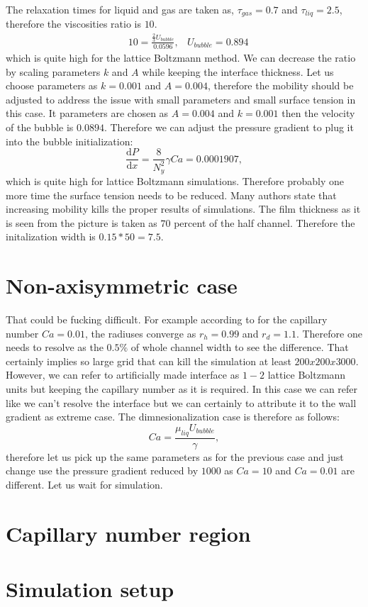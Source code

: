 \documentclass{article}
\begin{document}
The relaxation times for liquid and gas are taken as, $\tau_{gas}=0.7$ and $\tau_{liq}=2.5$,
therefore the viscosities ratio is $10$.
\begin{equation}
\begin{aligned}
&10=\frac{\frac{2}{3} U_{bubble}}{0.0596},
&U_{bubble}=0.894
\end{aligned}
\end{equation}
which is quite high for the lattice Boltzmann method. We can decrease the ratio by scaling
parameters $k$ and $A$ while keeping the interface thickness. Let us choose parameters as $k=0.001$
and $A=0.004$, therefore the mobility should be adjusted to address the issue with small parameters
and small surface tension in this case. It parameters are chosen as $A=0.004$ and $k=0.001$ then
the velocity of the bubble is  $0.0894$. Therefore we can adjust the pressure gradient to plug it
into the bubble initialization:
\begin{equation}
\frac{\mathrm{d}P}{\mathrm{d}x}=\frac{8}{N_y^2} \gamma Ca=0.0001907,
\end{equation}
which is quite high for lattice Boltzmann simulations. Therefore probably one more time the surface
tension needs to be reduced. {\color{red} Many authors state that increasing mobility kills the
proper results of simulations}. 
The film thickness as it is seen from the picture is taken as $70$ percent of the half channel.
Therefore the initalization width is $0.15*50=7.5$. 

\section{Non-axisymmetric case}
That could be fucking difficult. For example according to \cite{heil-threedim} for the capillary
number $Ca=0.01$, the radiuses converge as $r_h=0.99$ and $r_d=1.1$. Therefore one needs to resolve
as the $0.5\%$ of whole channel width to see the difference. That certainly implies so large grid
that can kill the simulation at least $200x200x3000$. However, we can refer to artificially made
interface as $1-2$ lattice Boltzmann units but keeping the capillary number as it is required. In
this case we can refer like we can't resolve the interface but we can certainly to attribute it to
the wall gradient as extreme case. The dimnesionalization case is therefore as follows:
\begin{equation}
Ca=\frac{\mu_{liq} U_{bubble}}{\gamma},
\end{equation}
therefore let us pick up the same parameters as for the previous case and just change use the
pressure gradient reduced by $1000$ as $Ca=10$ and $Ca=0.01$ are different. 
Let us wait for simulation.

\section{Capillary number region}



\section{Simulation setup}




\end{document}
